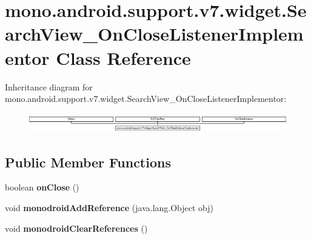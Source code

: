 \hypertarget{classmono_1_1android_1_1support_1_1v7_1_1widget_1_1_search_view___on_close_listener_implementor}{}\section{mono.\+android.\+support.\+v7.\+widget.\+Search\+View\+\_\+\+On\+Close\+Listener\+Implementor Class Reference}
\label{classmono_1_1android_1_1support_1_1v7_1_1widget_1_1_search_view___on_close_listener_implementor}
Inheritance diagram for mono.\+android.\+support.\+v7.\+widget.\+Search\+View\+\_\+\+On\+Close\+Listener\+Implementor\+:\begin{figure}[H]
\begin{center}
\leavevmode
\includegraphics[height=0.844646cm]{classmono_1_1android_1_1support_1_1v7_1_1widget_1_1_search_view___on_close_listener_implementor}
\end{center}
\end{figure}
\subsection*{Public Member Functions}
\begin{DoxyCompactItemize}
\item 
\mbox{\label{classmono_1_1android_1_1support_1_1v7_1_1widget_1_1_search_view___on_close_listener_implementor_a5f434ffc99aab8b87c5cb0e0fbdde7bc}} 
boolean {\bfseries on\+Close} ()
\item 
\mbox{\label{classmono_1_1android_1_1support_1_1v7_1_1widget_1_1_search_view___on_close_listener_implementor_a5622e5a877333e34785ae8e8343ee55f}} 
void {\bfseries monodroid\+Add\+Reference} (java.\+lang.\+Object obj)
\item 
\mbox{\label{classmono_1_1android_1_1support_1_1v7_1_1widget_1_1_search_view___on_close_listener_implementor_a0b4a5624059750f110ead6d67deaad28}} 
void {\bfseries monodroid\+Clear\+References} ()
\end{DoxyCompactItemize}
